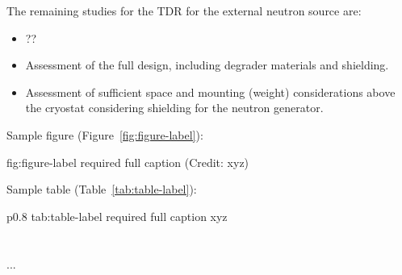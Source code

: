 The remaining studies for the TDR for the external neutron source are:
\begin{itemize}
\item ?? 
\item Assessment of the full design, including degrader materials and shielding.
\item Assessment of sufficient space and mounting (weight) considerations above the cryostat considering shielding for the neutron generator. 
\end{itemize}




Sample figure (Figure~\ref{fig:figure-label}):

\begin{dunefigure}{fig:figure-label}
{required full caption (Credit: xyz)}
\end{dunefigure}

Sample table (Table~\ref{tab:table-label}):

\begin{dunetable}
{p{0.8\textwidth}}
{tab:table-label}
{required full caption}   
xyz  \\ \toprowrule
  \\ \colhline
   \\ \colhline
 ...\\ 
\end{dunetable}
